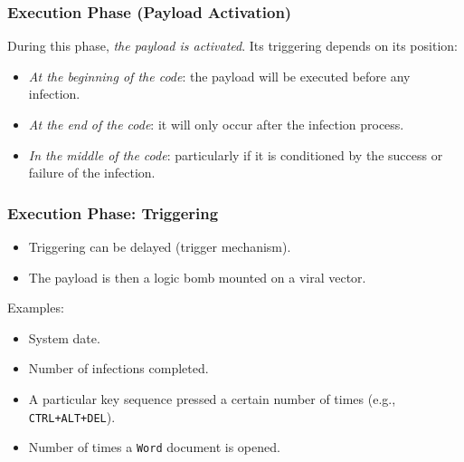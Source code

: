 \documentclass{beamer}
\newcommand{\enlight}[1]{\textit{\color{blue}#1}}
\begin{document}
\begin{frame}
\frametitle{Execution Phase (Payload Activation)}
During this phase, \enlight{the payload is activated}. Its triggering depends on its position: %
\begin{itemize}
\item \enlight{At the beginning of the code}: the payload will be executed before any infection. %
\item \enlight{At the end of the code}: it will only occur after the infection process.
\item \enlight{In the middle of the code}: particularly if it is conditioned by the success or failure of the infection.
\end{itemize}
\end{frame}


\begin{frame}
  \frametitle{Execution Phase: Triggering}
  \begin{itemize}
\item Triggering can be delayed (trigger mechanism).

\item  The payload is then a logic bomb mounted on a viral vector.
  \end{itemize}
  \medskip

{\color{blue} Examples:}


\begin{itemize}
\item System date.
\item Number of infections completed.
\item A particular key sequence pressed a certain number of times (e.g., \texttt{CTRL+ALT+DEL}).
\item Number of times a \texttt{Word} document is opened.
\end{itemize}
\end{frame}
\end{document}
